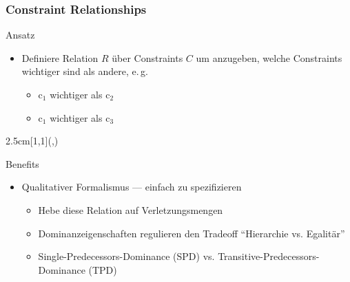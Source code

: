 \documentclass[handout,10pt,xcolor={dvipsnames},fleqn]{beamer}
\newcommand{\cemph}[1]{\alert{#1}}
\begin{document}
\begin{frame}
\frametitle{Constraint Relationships}

Ansatz~\cite{Schiendorfer13}
\begin{itemize}
  \item Definiere Relation $R$ über Constraints $C$ um anzugeben, welche Constraints wichtiger sind als andere, e.\,g.
\begin{itemize}
  \item $\mathrm{c}_1$ wichtiger als $\mathrm{c}_2$

  \item $\mathrm{c}_1$ wichtiger als $\mathrm{c}_3$
\end{itemize}
\end{itemize}
\begin{textblock*}{2.5cm}[1,1](\textwidth-1.5cm,\textheight-4.03cm)
\end{textblock*}

\vspace*{5.6ex}

Benefits
\begin{itemize}
  \item \cemph{Qualitativer} Formalismus --- einfach zu spezifizieren
\begin{itemize}
 \item Hebe diese Relation auf Verletzungsmengen
  \item \cemph{Dominanzeigenschaften} regulieren den Tradeoff ``Hierarchie vs. Egalitär''
  \item Single-Predecessors-Dominance (SPD) vs. Transitive-Predecessors-Dominance (TPD)
\end{itemize}

\end{itemize}

\end{frame}
\end{document}
